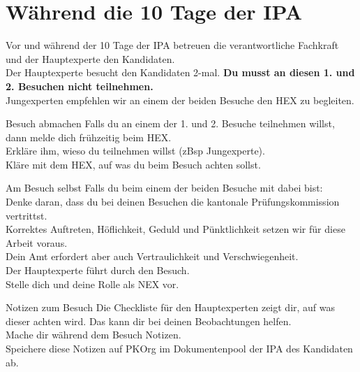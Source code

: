 \section{Während die 10 Tage der IPA}
Vor und während der 10 Tage der IPA betreuen die verantwortliche Fachkraft und der Hauptexperte den Kandidaten.\\
Der Hauptexperte besucht den Kandidaten 2-mal.
\textbf{Du musst an diesen 1. und 2. Besuchen nicht teilnehmen.}\\
Jungexperten empfehlen wir an einem der beiden Besuche den HEX zu begleiten.
\begin{taskitem}{Besuch abmachen}
  Falls du an einem der 1. und 2. Besuche teilnehmen willst, dann melde dich frühzeitig beim HEX.\\
  Erkläre ihm, wieso du teilnehmen willst (zBsp Jungexperte).\\
  Kläre mit dem HEX, auf was du beim Besuch achten sollst.
\end{taskitem}
\begin{taskitemwithoutcomment}{Am Besuch selbst}
  Falls du beim einem der beiden Besuche mit dabei bist:\\
  Denke daran, dass du bei deinen Besuchen die kantonale Prüfungskommission vertrittst.\\
  Korrektes Auftreten, Höflichkeit, Geduld und Pünktlichkeit setzen wir für diese Arbeit voraus.\\
  Dein Amt erfordert aber auch Vertraulichkeit und Verschwiegenheit.\\
  Der Hauptexperte führt durch den Besuch.\\
  Stelle dich und deine Rolle als NEX vor.
\end{taskitemwithoutcomment}
\begin{taskitemwithoutcomment}{Notizen zum Besuch}
  Die Checkliste für den Hauptexperten zeigt dir, auf was dieser achten wird. Das kann dir bei deinen Beobachtungen helfen.\\
  Mache dir während dem Besuch Notizen.\\
  Speichere diese Notizen auf PKOrg im Dokumentenpool der IPA des Kandidaten ab.
\end{taskitemwithoutcomment}
